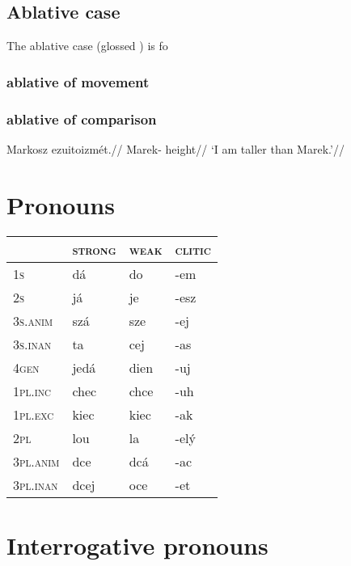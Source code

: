\subsection{Ablative case}
The ablative case (glossed ) is fo

\subsubsection{ablative of movement}
\subsubsection{ablative of comparison}
\pex
\begingl
\gla Markosz ezuitoizmét.//
\glb Marek- height//
\glft `I am taller than Marek.'//
\endgl
\xe

\section{Pronouns}

\begin{table}[h!]
	\centering \footnotesize
	\begin{tabularx}{0.7\textwidth}{>{\scshape}YMMM}
		\toprule
		 &\textsc{strong} &\textsc{weak}&\textsc{clitic}\\
		\midrule
		1s &dá&do&-em\\ \addlinespace
		2s&já&je&-esz\\ \addlinespace
		3s.anim&szá&sze&-ej\\ \addlinespace
		3s.inan&ta&cej&-as\\ \addlinespace
		4gen&jedá&dien&-uj\\ \addlinespace
		1pl.inc&chec&chce&-uh\\ \addlinespace
		1pl.exc&kiec&kiec&-ak\\ \addlinespace
		2pl&lou&la&-elý\\ \addlinespace
		3pl.anim&dce&dcá&-ac\\ \addlinespace
		3pl.inan&dcej&oce&-et\\ \bottomrule
	\end{tabularx}
\end{table}

\section{Interrogative pronouns}

